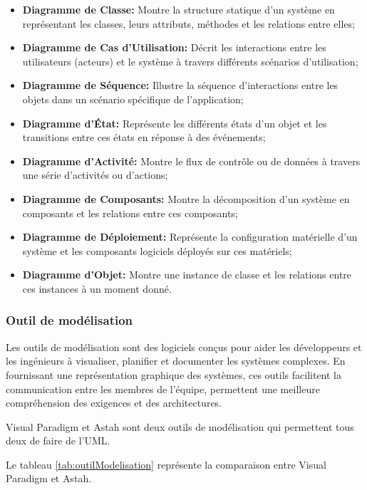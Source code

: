 \documentclass[12pt]{report}
\begin{document}
				\begin{itemize}
					\item \textbf{Diagramme de Classe:} Montre la structure statique d'un système en représentant les classes, leurs attributs, méthodes et les relations entre elles;
					\item \textbf{Diagramme de Cas d'Utilisation:} Décrit les interactions entre les utilisateurs (acteurs) et le système à travers différents scénarios d'utilisation;
					\item \textbf{Diagramme de Séquence:} Illustre la séquence d'interactions entre les objets dans un scénario spécifique de l'application;
					\item \textbf{Diagramme d'État:} Représente les différents états d'un objet et les transitions entre ces états en réponse à des événements;
					\item \textbf{Diagramme d'Activité:} Montre le flux de contrôle ou de données à travers une série d'activités ou d'actions;
					\item \textbf{Diagramme de Composants:} Montre la décomposition d'un système en composants et les relations entre ces composants;
					\item \textbf{Diagramme de Déploiement:} Représente la configuration matérielle d'un système et les composants logiciels déployés sur ces matériels;
					\item \textbf{Diagramme d'Objet:} Montre une instance de classe et les relations entre ces instances à un moment donné.
				\end{itemize}
				


				\subsubsection{Outil de modélisation}

				\hspace{15pt} Les outils de modélisation sont des logiciels conçus pour aider les développeurs et les ingénieurs à visualiser, planifier et documenter les systèmes complexes. En fournissant une représentation graphique des systèmes, ces outils facilitent la communication entre les membres de l'équipe, permettent une meilleure compréhension des exigences et des architectures.

				Visual Paradigm et Astah sont deux outils de modélisation qui permettent tous deux de faire de l'UML.


				Le tableau \ref{tab:outilModelisation} représente la comparaison entre Visual Paradigm et Astah.
\end{document}
